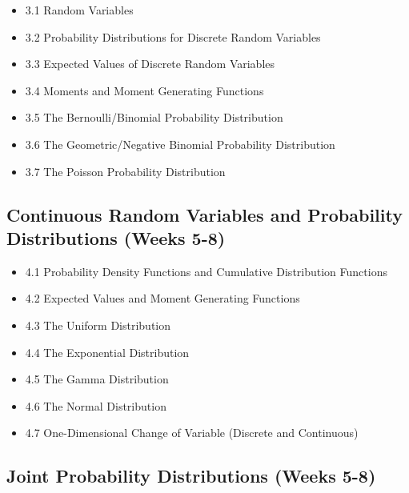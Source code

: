\documentclass[]{book}
\providecommand{\tightlist}{%
  \setlength{\itemsep}{0pt}\setlength{\parskip}{0pt}}
\theoremstyle{definition}
\theoremstyle{definition}
\theoremstyle{definition}
\theoremstyle{remark}
\begin{document}
\begin{itemize}
\tightlist
\item
  3.1 Random Variables
\item
  3.2 Probability Distributions for Discrete Random Variables
\item
  3.3 Expected Values of Discrete Random Variables
\item
  3.4 Moments and Moment Generating Functions
\item
  3.5 The Bernoulli/Binomial Probability Distribution
\item
  3.6 The Geometric/Negative Binomial Probability Distribution
\item
  3.7 The Poisson Probability Distribution
\end{itemize}

\subsection*{Continuous Random Variables and Probability Distributions
(Weeks
5-8)}\label{continuous-random-variables-and-probability-distributions-weeks-5-8}

\begin{itemize}
\tightlist
\item
  4.1 Probability Density Functions and Cumulative Distribution
  Functions\\
\item
  4.2 Expected Values and Moment Generating Functions\\
\item
  4.3 The Uniform Distribution\\
\item
  4.4 The Exponential Distribution\\
\item
  4.5 The Gamma Distribution\\
\item
  4.6 The Normal Distribution\\
\item
  4.7 One-Dimensional Change of Variable (Discrete and Continuous)
\end{itemize}

\subsection*{Joint Probability Distributions (Weeks
5-8)}\label{joint-probability-distributions-weeks-5-8}
\end{document}
